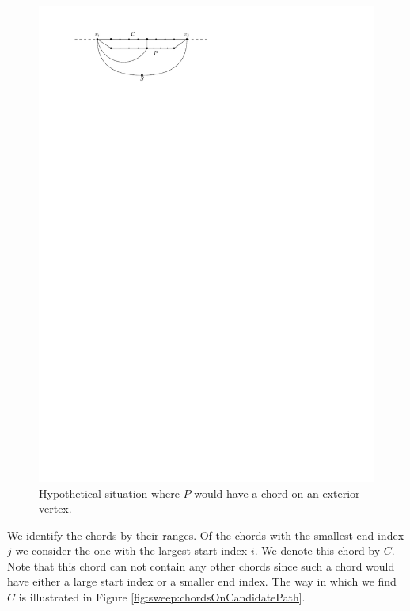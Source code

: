     \begin{figure}[h]
      \centering
      \includegraphics[scale=1]{unifiedAlgo/img/sweep/noChordOnExtriorVertex.pdf}
      \caption{Hypothetical situation where $P$ would have a chord on an exterior vertex.}
      \label{fig:sweep:noChordOnExteriorVertex}
    \end{figure}

    We identify the chords by their ranges. Of the chords with the smallest end index $j$ we consider the one with the largest start index $i$. We denote this chord by $C$.
    Note that this chord can not contain any other chords since such a chord would have either a large start index or a smaller end index.
    The way in which we find $C$ is illustrated in Figure \ref{fig:sweep:chordsOnCandidatePath}.

